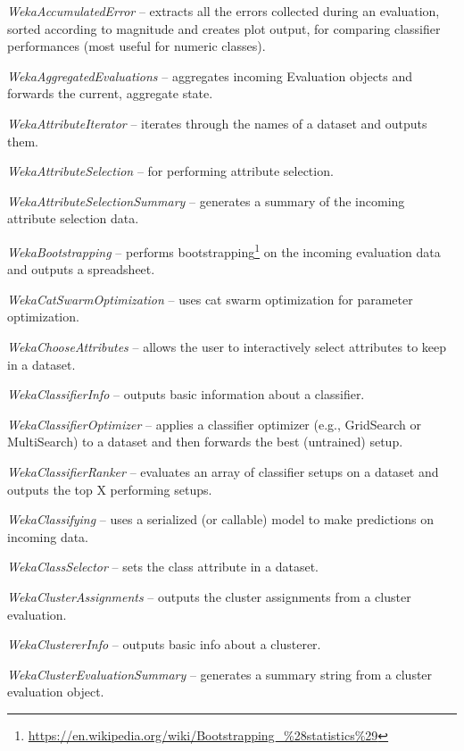 \begin{tight_itemize}
	\item \textit{WekaAccumulatedError} -- extracts all the errors
	collected during an evaluation, sorted according to magnitude and
	creates plot output, for comparing classifier performances (most useful
	for numeric classes).
	\item \textit{WekaAggregatedEvaluations} -- aggregates incoming
	Evaluation objects and forwards the current, aggregate state. 
	\item \textit{WekaAttributeIterator} -- iterates through the names of a
	dataset and outputs them.
	\item \textit{WekaAttributeSelection} -- for performing attribute selection.
	\item \textit{WekaAttributeSelectionSummary} -- generates a summary of the
	incoming attribute selection data.
	\item \textit{WekaBootstrapping} -- performs bootstrapping\footnote{\url{https://en.wikipedia.org/wiki/Bootstrapping\_\%28statistics\%29}{}}
	on the incoming evaluation data and outputs a spreadsheet.
	\item \textit{WekaCatSwarmOptimization} -- uses cat swarm optimization
	for parameter optimization.
	\item \textit{WekaChooseAttributes} -- allows the user to interactively
	select attributes to keep in a dataset.
	\item \textit{WekaClassifierInfo} -- outputs basic information about
	a classifier.
	\item \textit{WekaClassifierOptimizer} -- applies a classifier optimizer
	(e.g., GridSearch or MultiSearch) to a dataset and then forwards the best
	(untrained) setup.
	\item \textit{WekaClassifierRanker} -- evaluates an array of classifier
	setups on a dataset and outputs the top X performing setups.
	\item \textit{WekaClassifying} -- uses a serialized (or callable) model to
	make predictions on incoming data.
	\item \textit{WekaClassSelector} -- sets the class attribute in a dataset.
	\item \textit{WekaClusterAssignments} -- outputs the cluster assignments
	from a cluster evaluation.
	\item \textit{WekaClustererInfo} -- outputs basic info about a clusterer.
	\item \textit{WekaClusterEvaluationSummary} -- generates a summary string
	from a cluster evaluation object.

\end{tight_itemize}
